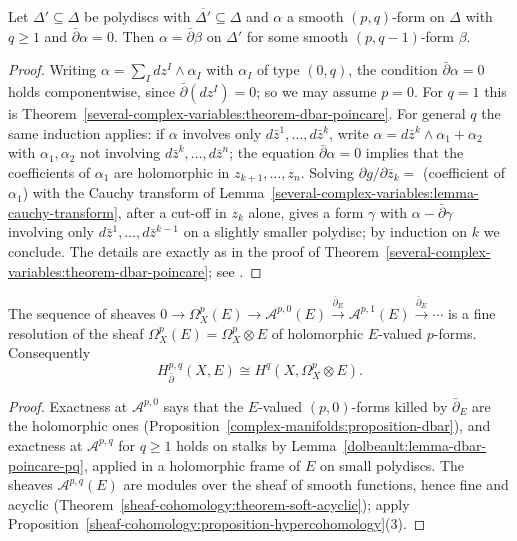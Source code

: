 \begin{lemma}\label{dolbeault:lemma-dbar-poincare-pq}
Let $\Delta' \subseteq \Delta$ be polydiscs with $\overline{\Delta'} \subseteq \Delta$ and $\alpha$ a smooth $(p,q)$-form on $\Delta$ with $q \geq 1$ and $\bar\partial\alpha = 0$. Then $\alpha = \bar\partial\beta$ on $\Delta'$ for some
smooth $(p, q-1)$-form $\beta$.
\end{lemma}

\begin{proof}
Writing $\alpha = \sum_I dz^I \wedge \alpha_I$ with $\alpha_I$ of type $(0,q)$, the condition $\bar\partial\alpha = 0$ holds componentwise, since $\bar\partial(dz^I) = 0$; so we may assume $p = 0$. For $q = 1$ this is
Theorem~\ref{several-complex-variables:theorem-dbar-poincare}. For general $q$ the same induction applies: if $\alpha$ involves only $d\bar z^1, \ldots, d\bar z^k$, write
$\alpha = d\bar z^k \wedge \alpha_1 + \alpha_2$ with $\alpha_1, \alpha_2$ not involving $d\bar z^k, \ldots, d\bar z^n$; the equation $\bar\partial\alpha = 0$ implies that the coefficients of $\alpha_1$ are holomorphic in
$z_{k+1}, \ldots, z_n$. Solving $\partial g/\partial\bar z_k = $ (coefficient of $\alpha_1$) with the Cauchy transform of Lemma~\ref{several-complex-variables:lemma-cauchy-transform}, after a cut-off in $z_k$
alone, gives a form $\gamma$ with $\alpha - \bar\partial\gamma$ involving only $d\bar z^1, \ldots, d\bar z^{k-1}$ on a slightly smaller polydisc; by induction on $k$ we conclude. The details are exactly as in the proof of
Theorem~\ref{several-complex-variables:theorem-dbar-poincare}; see \cite[Chapter 0, Section 2]{griffiths-harris}.
\end{proof}

\begin{theorem}[Dolbeault]\label{dolbeault:theorem-dolbeault}
The sequence of sheaves $0 \to \Omega^p_X(E) \to \mathcal{A}^{p,0}(E) \xrightarrow{\bar\partial_E} \mathcal{A}^{p,1}(E) \xrightarrow{\bar\partial_E} \cdots$ is a fine resolution of the sheaf
$\Omega^p_X(E) = \Omega^p_X \otimes E$ of holomorphic $E$-valued $p$-forms. Consequently
\[
H^{p,q}_{\bar\partial}(X, E) \cong H^q(X, \Omega^p_X \otimes E).
\]
\end{theorem}

\begin{proof}
Exactness at $\mathcal{A}^{p,0}$ says that the $E$-valued $(p,0)$-forms killed by $\bar\partial_E$ are the holomorphic ones (Proposition~\ref{complex-manifolds:proposition-dbar}), and exactness at
$\mathcal{A}^{p,q}$ for $q \geq 1$ holds on stalks by Lemma~\ref{dolbeault:lemma-dbar-poincare-pq}, applied in a holomorphic frame of $E$ on small polydiscs. The sheaves $\mathcal{A}^{p,q}(E)$ are modules over the
sheaf of smooth functions, hence fine and acyclic (Theorem~\ref{sheaf-cohomology:theorem-soft-acyclic}); apply Proposition~\ref{sheaf-cohomology:proposition-hypercohomology}(3).
\end{proof}

